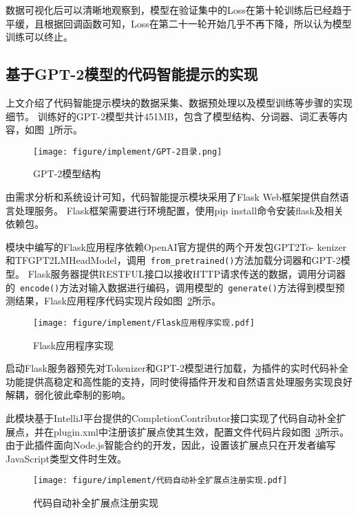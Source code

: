 数据可视化后可以清晰地观察到，模型在验证集中的Loss在第十轮训练后已经趋于平缓，且根据回调函数可知，Loss在第二十一轮开始几乎不再下降，所以认为模型训练可以终止。

\subsection{基于GPT-2模型的代码智能提示的实现}

上文介绍了代码智能提示模块的数据采集、数据预处理以及模型训练等步骤的实现细节。
训练好的GPT-2模型共计451MB，包含了模型结构、分词器、词汇表等内容，如图~\ref{fig:5.11}所示。

\begin{figure}[htb]
  \centering
  \texttt{[image: figure/implement/GPT-2目录.png]}
  \caption{GPT-2模型结构}\label{fig:5.11}
\end{figure}

由需求分析和系统设计可知，代码智能提示模块采用了Flask Web框架提供自然语言处理服务。
Flask框架需要进行环境配置，使用pip install命令安装flask及相关依赖包。

模块中编写的Flask应用程序依赖OpenAI官方提供的两个开发包GPT2To- \linebreak kenizer和TFGPT2LMHeadModel，调用~\texttt{from\_pretrained()}方法加载分词器和GPT-2模型。
Flask服务器提供RESTFUL接口以接收HTTP请求传送的数据，调用分词器的~\texttt{encode()}方法对输入数据进行编码，调用模型的~\texttt{generate()}方法得到模型预测结果，Flask应用程序代码实现片段如图~\ref{fig:5.12}所示。

\begin{figure}[htb]
  \centering
  \texttt{[image: figure/implement/Flask应用程序实现.pdf]}
  \caption{Flask应用程序实现}\label{fig:5.12}
\end{figure}

启动Flask服务器预先对Tokenizer和GPT-2模型进行加载，为插件的实时代码补全功能提供高稳定和高性能的支持，同时使得插件开发和自然语言处理服务实现良好解耦，弱化彼此牵制的影响。

此模块基于IntelliJ平台提供的CompletionContributor接口实现了代码自动补全扩展点，并在plugin.xml中注册该扩展点使其生效，配置文件代码片段如图~\ref{fig:5.13}所示。
由于此插件面向Node.js智能合约的开发，因此，设置该扩展点只在开发者编写JavaScript类型文件时生效。

\begin{figure}[htb]
  \centering
  \texttt{[image: figure/implement/代码自动补全扩展点注册实现.pdf]}
  \caption{代码自动补全扩展点注册实现}\label{fig:5.13}
\end{figure}

